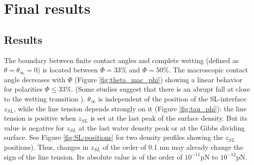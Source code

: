 \section{Final results}

\subsection{Results\label{chap:Results}}

The boundary between finite contact angles and complete wetting (defined
as $\theta=\theta_{\infty}=0$) is located between $\Phi=33\%$ and
$\Phi=50\%$. The macroscopic contact angle decreases with $\Phi$
(Figure \ref{fig:theta_mac_phi}) showing a linear behavior for polarities
$\Phi\leq33\%$. (Some studies suggest that there is an abrupt fall
at close to the wetting transition \cite{giovambattista:2007,kanduc:2014a,sedlmeier:2008}).
$\theta_{\infty}$ is independent of the position of the SL-interface
$z_{SL}$, while the line tension depends strongly on it (Figure \ref{fig:tau_phi}):
the line tension is positive when $z_{SL}$ is set at the last peak
of the surface density. But its value is negative for $z_{SL}$ at
the last water density peak or at the Gibbs dividing surface. See
Figure \ref{fig:SL-positions} for two density profiles showing the
$z_{SL}$ positions). Thus, changes in $z_{SL}$ of the order of 0.1
nm may already change the sign of the line tension. Its absolute value
is of the order of $10^{-11}\mathrm{pN}$ to $\mathrm{10^{-12}pN}$.